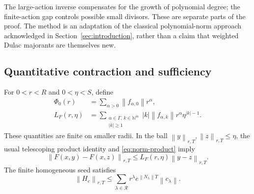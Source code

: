 \documentclass[11pt,a4paper]{article}
\numberwithin{equation}{section}
\theoremstyle{definition}
\theoremstyle{remark}
\newcommand{\NN}{\mathbb N}
\newcommand{\G}{\Gamma}
\newcommand{\Reson}{\mathcal R}
\newcommand{\norm}[1]{\left\lVert #1\right\rVert}
\begin{document}
The large-action inverse compensates for the growth of polynomial
degree; the finite-action gap controls possible small divisors. These
are separate parts of the proof. The method is an adaptation of the
classical polynomial-norm approach acknowledged in
Section~\ref{sec:introduction}, rather than a claim that weighted
Dulac majorants are themselves new.

\subsection{Quantitative contraction and sufficiency}
For \(0<r<R\) and \(0<\eta<S\), define
\begin{align}
 \Phi_0(r)&=\sum_{\alpha>0}\norm{f_{\alpha,0}}r^\alpha,
                  \label{eq:forcing-majorant}\\
 L_F(r,\eta)&=
   \sum_{\substack{\alpha\in\G,\,k\in\NN^m\\|k|\ge1}}
   |k|\norm{f_{\alpha,k}}r^\alpha\eta^{|k|-1}.
                  \label{eq:lipschitz-majorant}
\end{align}
These quantities are finite on smaller radii. In the ball
\(\norm{y}_{r,T},\norm{z}_{r,T}\le\eta\), the usual telescoping
product identity and \eqref{eq:norm-product} imply
\begin{equation}\label{eq:majorant-Lipschitz}
 \norm{F(x,y)-F(x,z)}_{r,T}
 \le L_F(r,\eta)\norm{y-z}_{r,T}.
\end{equation}
The finite homogeneous seed satisfies
\begin{equation}\label{eq:seed-norm}
 \norm{H_c}_{r,T}
 \le\sum_{\lambda\in\Reson}
        r^\lambda e^{\norm{N_\lambda}T}\norm{c_\lambda}.
\end{equation}
\end{document}
